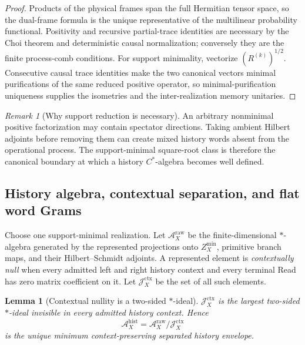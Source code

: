 \documentclass[11pt]{article}
\newtheorem{lemma}[lemma]{Lemma}
\theoremstyle{definition}
\theoremstyle{remark}
\newtheorem{remark}[remark]{Remark}
\begin{document}
\begin{proof}
Products of the physical frames span the full Hermitian tensor space, so the
dual-frame formula is the unique representative of the multilinear
probability functional.  Positivity and recursive partial-trace identities are
necessary by the Choi theorem and deterministic causal normalization;
conversely they are the finite process-comb conditions.  For support
minimality, vectorize $(R^{(k)})^{1/2}$.  Consecutive causal trace identities
make the two canonical vectors minimal purifications of the same reduced
positive operator, so minimal-purification uniqueness supplies the isometries
and the inter-realization memory unitaries.
\end{proof}

\begin{remark}[Why support reduction is necessary]
An arbitrary nonminimal positive factorization may contain spectator
directions.  Taking ambient Hilbert adjoints before removing them can create
mixed history words absent from the operational process.  The support-minimal
square-root class is therefore the canonical boundary at which a history
$C^*$-algebra becomes well defined.
\end{remark}

\subsection{History algebra, contextual separation, and flat word Grams}

Choose one support-minimal realization.  Let $\mathcal A_X^{\mathrm{raw}}$ be
the finite-dimensional $*$-algebra generated by the represented projections
onto $Z_X^{\min}$, primitive branch maps, and their Hilbert--Schmidt adjoints.
A represented element is \emph{contextually null} when every admitted left and
right history context and every terminal Read has zero matrix coefficient on
it.  Let $\mathcal J_X^{\mathrm{ctx}}$ be the set of all such elements.

\begin{lemma}[Contextual nullity is a two-sided $*$-ideal]
\label{lem:supp-contextual-ideal}
$\mathcal J_X^{\mathrm{ctx}}$ is the largest two-sided $*$-ideal invisible in
every admitted history context.  Hence
\begin{equation}
 \mathcal A_X^{\mathrm{hist}}
 =\mathcal A_X^{\mathrm{raw}}/\mathcal J_X^{\mathrm{ctx}}
 \label{eq:supp-history-algebra}
\end{equation}
is the unique minimum context-preserving separated history envelope.
\end{lemma}
\end{document}
